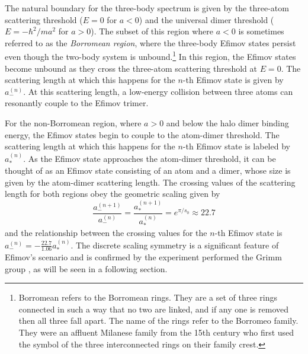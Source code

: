 \documentclass[prl,onecolumn,amsmath,amssymb,titlepage,nofootinbib,preprint]{revtex4-1}
\begin{document}
	The natural boundary for the three-body spectrum is given by the three-atom scattering threshold ($E=0$ for $a<0$) and the universal dimer \cite{landau1977quantum} threshold ($E=-\hbar^{2}/ma^{2}$ for $a>0$).  The subset of this region where $a<0$ is sometimes referred to as the \textit{Borromean region}, where the three-body Efimov states persist even though the two-body system is unbound.\footnote{Borromean refers to the Borromean rings.  They are a set of three rings connected in such a way that no two are linked, and if any one is removed then all three fall apart. The name of the rings refer to the Borromeo family.  They were an affluent Milanese family from the 15th century who first used the symbol of the three interconnected rings on their family crest.}  In this region, the Efimov states become unbound as they cross the three-atom scattering threshold at $E=0$.  The scattering length at which this happens for the $n$-th Efimov state is given by $a_{-}^{(n)}$.  At this scattering length, a low-energy collision between three atoms can resonantly couple to the Efimov trimer.  
	
	For the non-Borromean region, where $a>0$ and below the halo dimer binding energy, the Efimov states begin to couple to the atom-dimer threshold.  The scattering length at which this happens for the $n$-th Efimov state is labeled by $a_{*}^{(n)}$.  As the Efimov state approaches the atom-dimer threshold, it can be thought of as an Efimov state consisting of an atom and a dimer, whose size is given by the atom-dimer scattering length.  The crossing values of the scattering length for both regions obey the geometric scaling given by \cite{Braaten_2006}
		\begin{equation}\label{eq:geometric_scaling_a}
			\frac{a_{-}^{(n+1)}}{a_{-}^{(n)}}=\frac{a_{*}^{(n+1)}}{a_{*}^{(n)}}=e^{\pi/s_{0}}\approx22.7
		\end{equation} 
	and the relationship between the crossing values for the $n$-th Efimov state is  $a_{-}^{(n)}=-\frac{22.7}{1.06}a_{*}^{(n)}$.  The discrete scaling symmetry is a significant feature of Efimov's scenario and is confirmed by the experiment performed the Grimm group \cite{Huang2014}, as will be seen in a following section.
	
\end{document}

